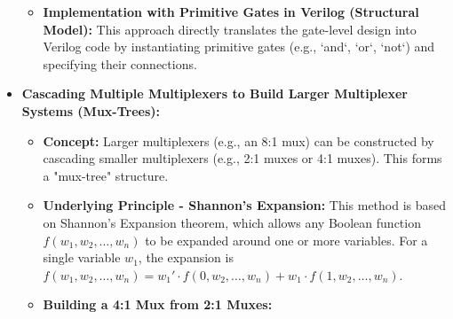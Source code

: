 \documentclass{article}
\begin{document}
\begin{itemize}
\begin{itemize}
\begin{itemizeDeep}
\begin{itemize}
                        \end{itemize}
                \end{itemizeDeep}
            \item \textbf{Implementation with Primitive Gates in Verilog (Structural Model):} This approach directly translates the gate-level design into Verilog code by instantiating primitive gates (e.g., `and`, `or`, `not`) and specifying their connections.
        \end{itemize}
    \item \textbf{Cascading Multiple Multiplexers to Build Larger Multiplexer Systems (Mux-Trees):}
    
        \begin{itemize}
            \item \textbf{Concept:} Larger multiplexers (e.g., an 8:1 mux) can be constructed by cascading smaller multiplexers (e.g., 2:1 muxes or 4:1 muxes). This forms a "mux-tree" structure.
            \item \textbf{Underlying Principle - Shannon's Expansion:} This method is based on Shannon's Expansion theorem, which allows any Boolean function $f(w_1, w_2, \ldots, w_n)$ to be expanded around one or more variables. For a single variable $w_1$, the expansion is $f(w_1, w_2, \ldots, w_n) = w_1' \cdot f(0, w_2, \ldots, w_n) + w_1 \cdot f(1, w_2, \ldots, w_n)$.
            
            \item \textbf{Building a 4:1 Mux from 2:1 Muxes:}
            
\end{itemize}
\end{itemize}
\end{document}
